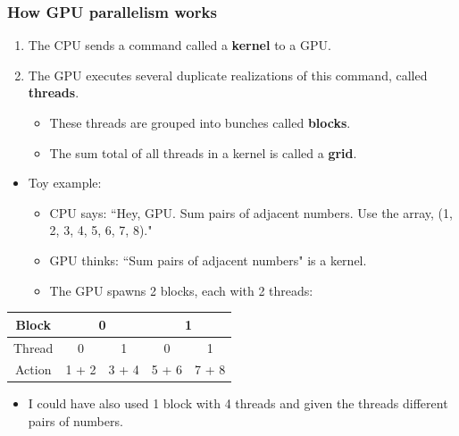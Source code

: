 \documentclass[handout]{beamer}
\numberwithin{equation}{section}
\begin{document}
\begin{frame}
\frametitle{How GPU parallelism works}
\begin{enumerate}
\item The CPU sends a command called a {\bf kernel} to a GPU.
\pause \item The GPU executes several duplicate realizations of this command, called {\bf threads}.
\begin{itemize}
\pause \item These threads are grouped into bunches called {\bf blocks}.
\pause \item The sum total of all threads in a kernel is called a {\bf grid}.
\end{itemize}
\end{enumerate}

\begin{itemize}
\item Toy example:
\begin{itemize}
\item CPU says: ``Hey, GPU. Sum pairs of adjacent numbers. Use the array, (1, 2, 3, 4, 5, 6, 7, 8)."
\pause \item GPU thinks: ``Sum pairs of adjacent numbers" is a kernel.
\pause \item The GPU spawns 2 blocks, each with 2 threads:
\end{itemize}
\end{itemize}

\pause \begin{center}
\begin{tabular}{c|cc|cc}
Block  & \multicolumn{2}{c|}{0} &  \multicolumn{2}{c}{1} \\ \hline
Thread & 0 & 1 & 0 & 1  \\ \hline
Action & 1 + 2 & 3 + 4 & 5 + 6 & 7 + 8 \\
\end{tabular}
\end{center}

\begin{itemize}
\pause \item I could have also used 1 block with 4 threads and given the threads different pairs of numbers.
\end{itemize}
\end{frame}
\end{document}
